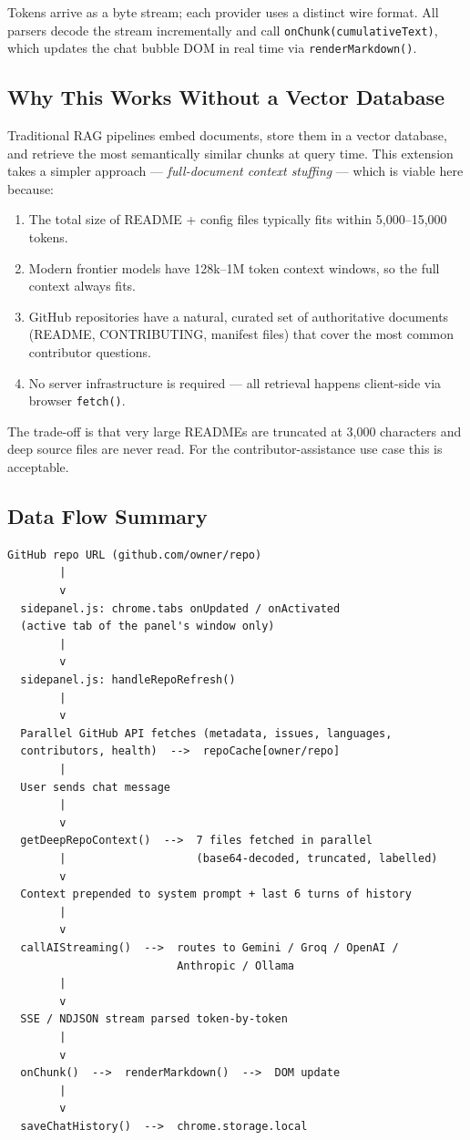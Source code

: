 \documentclass[11pt,a4paper]{article}
\begin{document}
\medskip
Tokens arrive as a byte stream; each provider uses a distinct wire format. All parsers decode the stream incrementally and call \texttt{onChunk(cumulativeText)}, which updates the chat bubble DOM in real time via \texttt{renderMarkdown()}.

\subsection{Why This Works Without a Vector Database}

Traditional RAG pipelines embed documents, store them in a vector database, and retrieve the most semantically similar chunks at query time. This extension takes a simpler approach — \emph{full-document context stuffing} — which is viable here because:

\begin{enumerate}[nosep]
    \item The total size of README + config files typically fits within 5,000--15,000 tokens.
    \item Modern frontier models have 128k--1M token context windows, so the full context always fits.
    \item GitHub repositories have a natural, curated set of authoritative documents (README, CONTRIBUTING, manifest files) that cover the most common contributor questions.
    \item No server infrastructure is required — all retrieval happens client-side via browser \texttt{fetch()}.
\end{enumerate}

The trade-off is that very large READMEs are truncated at 3,000 characters and deep source files are never read. For the contributor-assistance use case this is acceptable.

\subsection{Data Flow Summary}

\begin{lstlisting}
GitHub repo URL (github.com/owner/repo)
        |
        v
  sidepanel.js: chrome.tabs onUpdated / onActivated
  (active tab of the panel's window only)
        |
        v
  sidepanel.js: handleRepoRefresh()
        |
        v
  Parallel GitHub API fetches (metadata, issues, languages,
  contributors, health)  -->  repoCache[owner/repo]
        |
  User sends chat message
        |
        v
  getDeepRepoContext()  -->  7 files fetched in parallel
        |                    (base64-decoded, truncated, labelled)
        v
  Context prepended to system prompt + last 6 turns of history
        |
        v
  callAIStreaming()  -->  routes to Gemini / Groq / OpenAI /
                          Anthropic / Ollama
        |
        v
  SSE / NDJSON stream parsed token-by-token
        |
        v
  onChunk()  -->  renderMarkdown()  -->  DOM update
        |
        v
  saveChatHistory()  -->  chrome.storage.local
\end{lstlisting}
\end{document}
